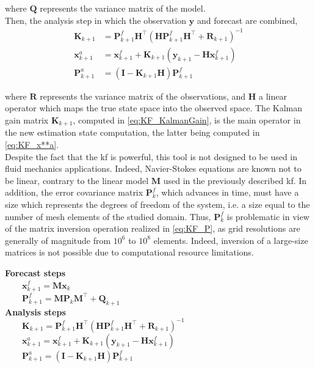 \documentclass[12pt,twoside]{report}
\begin{document}
where $\mathbf{Q}$ represents the variance matrix of the model.\\
Then, the analysis step in which the observation $\mathbf{y}$ and forecast are combined, 
\begin{align}
    \mathbf{K}_{k+1} &= \mathbf{P}^f_{k+1} \mathbf{H}^{\top} \left( \mathbf{H} \mathbf{P}^f_{k+1} \mathbf{H}^{\top} + \mathbf{R}_{k+1} \right) ^ {-1} \label{eq:KF_KalmanGain} \\
    \mathbf{x}^a_{k+1} &= \mathbf{x}^f_{k+1} + \mathbf{K}_{k+1} \left( \mathbf{y}_{k+1} - \mathbf{H} \mathbf{x}_{k+1}^f \right) \label{eq:KF_x**a} \\
    \mathbf{P}_{k+1}^a &= \left( \mathbf{I} - \mathbf{K}_{k+1} \mathbf{H} \right) \mathbf{P}_{k+1}^f \label{eq:KF_P}
\end{align}

where $\mathbf{R}$ represents the variance matrix of the observations, and $\mathbf{H}$ a linear operator which maps the true state space into the observed space. The Kalman gain matrix $\mathbf{K}_{k+1}$, computed in \autoref{eq:KF_KalmanGain}, is the main operator in the new estimation state computation, the latter being computed in \autoref{eq:KF_x**a}. \\

Despite the fact that the \gls{kf} is powerful, this tool is not designed to be used in fluid mechanics applications. Indeed, Navier-Stokes equations are known not to be linear, contrary to the linear model $\mathbf{M}$ used in the previously described \gls{kf}. In addition, the error covariance matrix $\mathbf{P}_k^f$, which advances in time, must have a size which represents the degrees of freedom of the system, i.e. a size equal to the number of mesh elements of the studied domain. Thus, $\mathbf{P}_k^f$ is problematic in view of the matrix inversion operation realized in \autoref{eq:KF_P}, as grid resolutions are generally of magnitude from $10^6$ to $10^8$ elements. Indeed, inversion of a large-size matrices is not possible due to computational resource limitations. 

\begin{algorithm}
\caption{Algorithm for the }
\label{alg:KF}
    \textbf{Forecast steps} \\
\nl $\qquad \mathbf{x}^f_{k+1} = \mathbf{M} \mathbf{x}_k $ \\
\nl $\qquad \mathbf{P}^f_{k+1} = \mathbf{M} \mathbf{P}_k \mathbf{M}^{\top} + \mathbf{Q}_{k+1}$ \\ \vspace*{0.5cm}
    \textbf{Analysis steps} \\
\nl $\qquad \mathbf{K}_{k+1} = \mathbf{P}^f_{k+1} \mathbf{H}^{\top} \left( \mathbf{H} \mathbf{P}^f_{k+1} \mathbf{H}^{\top} + \mathbf{R}_{k+1} \right) ^ {-1}$ \\
\nl $\qquad \mathbf{x}^a_{k+1} = \mathbf{x}^f_{k+1} + \mathbf{K}_{k+1} \left( \mathbf{y}_{k+1} - \mathbf{H} \mathbf{x}_{k+1}^f \right)$ \\
\nl $\qquad \mathbf{P}_{k+1}^a = \left( \mathbf{I} - \mathbf{K}_{k+1} \mathbf{H} \right) \mathbf{P}_{k+1}^f$
\end{algorithm}
\end{document}
